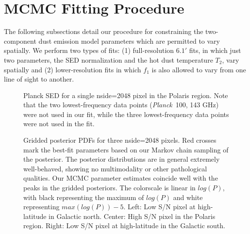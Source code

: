 \documentclass{emulateapj}
\newcommand{\PLANCK}{{\it Planck}}
\begin{document}


\section{MCMC Fitting Procedure}
\label{sec:fitting}

The following subsections detail our procedure for constraining the 
two-component dust emission model parameters which are permitted to vary
spatially. We perform two types of fits: (1) full-resolution 
$6.1'$ fits, in which just two parameters, the SED normalization and the hot 
dust temperature $T_2$, vary spatially and (2) lower-resolution fits in which 
$f_1$ is also allowed to vary from one line of sight to another.

\begin{figure}
\begin{center}
\caption{\label{fig:sed} Planck SED for a single nside=2048 pixel in the 
Polaris region. Note that the two lowest-frequency data points (\PLANCK~100, 
143 GHz) were not used in our fit, while the three lowest-frequency data
points were not used in the \cite{planckdust} fit.}
\end{center}
\end{figure}


\begin{figure*}
\begin{center}
\caption{Gridded posterior PDFs for three nside=2048 pixels. Red crosses mark 
the best-fit parameters based on our Markov chain sampling of the posterior. 
The posterior distributions are in general extremely well-behaved, showing
no multimodality or other pathological qualities. Our MCMC parameter 
estimates coincide well with the peaks in the gridded posteriors. The 
colorscale is linear in $log(P)$, with black representing the maximum of 
$log(P)$ and white representing $max(log(P))-5$. Left: Low S/N pixel at 
high-latitude in Galactic north. Center: High S/N pixel in the Polaris region. 
Right: Low S/N pixel at high-latitude in the Galactic south.}
\end{center}
\end{figure*}
\end{document}

